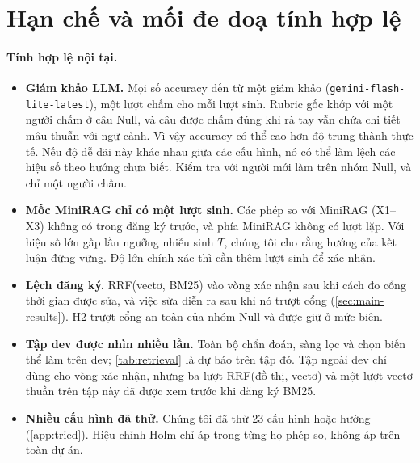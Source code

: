 \section{Hạn chế và mối đe doạ tính hợp lệ}\label{sec:limitations}

\paragraph{Tính hợp lệ nội tại.}
\begin{itemize}
  \item \textbf{Giám khảo LLM.} Mọi số accuracy đến từ một giám khảo (\texttt{gemini-flash-lite-latest}), một lượt chấm cho mỗi lượt sinh.
  Rubric gốc khớp với một người chấm ở \humanAgreeOrig{} câu Null, và \judgeLenient{} câu được chấm đúng khi rà tay vẫn chứa chi tiết mâu thuẫn với ngữ cảnh.
  Vì vậy accuracy có thể cao hơn độ trung thành thực tế. Nếu độ dễ dãi này khác nhau giữa các cấu hình, nó có thể làm lệch các hiệu số theo hướng chưa biết.
  Kiểm tra với người mới làm trên nhóm Null, và chỉ một người chấm.
  \item \textbf{Mốc MiniRAG chỉ có một lượt sinh.} Các phép so với MiniRAG (X1--X3) không có trong đăng ký trước, và phía MiniRAG không có lượt lặp.
  Với hiệu số lớn gấp \ratioXCT{} lần ngưỡng nhiễu sinh $T$, chúng tôi cho rằng hướng của kết luận đứng vững. Độ lớn chính xác thì cần thêm lượt sinh để xác nhận.
  \item \textbf{Lệch đăng ký.} RRF(vectơ, BM25) vào vòng xác nhận sau khi cách đo cổng thời gian được sửa, và việc sửa diễn ra sau khi nó trượt cổng (\cref{sec:main-results}).
  H2 trượt cổng an toàn của nhóm Null và được giữ ở mức biên.
  \item \textbf{Tập dev được nhìn nhiều lần.} Toàn bộ chẩn đoán, sàng lọc và chọn biến thể làm trên dev; \cref{tab:retrieval} là dự báo trên tập đó.
  Tập ngoài dev chỉ dùng cho vòng xác nhận, nhưng ba lượt RRF(đồ thị, vectơ) và một lượt vectơ thuần trên tập này đã được xem trước khi đăng ký BM25.
  \item \textbf{Nhiều cấu hình đã thử.} Chúng tôi đã thử 23 cấu hình hoặc hướng (\cref{app:tried}). Hiệu chỉnh Holm chỉ áp trong từng họ phép so, không áp trên toàn dự án.
\end{itemize}

